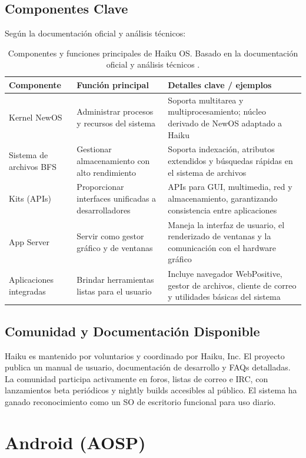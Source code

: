 \subsection{Componentes Clave}
Según la documentación oficial y análisis técnicos:
\begin{table}[H]
\centering
\begin{tabular}{p{3.2cm}p{5cm}p{6cm}}
\hline
\textbf{Componente} & \textbf{Función principal} & \textbf{Detalles clave / ejemplos} \\
\hline
Kernel NewOS & Administrar procesos y recursos del sistema & Soporta multitarea y multiprocesamiento; núcleo derivado de NewOS adaptado a Haiku \\
\hline
Sistema de archivos BFS & Gestionar almacenamiento con alto rendimiento & Soporta indexación, atributos extendidos y búsquedas rápidas en el sistema de archivos \\
\hline
Kits (APIs) & Proporcionar interfaces unificadas a desarrolladores & APIs para GUI, multimedia, red y almacenamiento, garantizando consistencia entre aplicaciones \\
\hline
App Server & Servir como gestor gráfico y de ventanas & Maneja la interfaz de usuario, el renderizado de ventanas y la comunicación con el hardware gráfico \\
\hline
Aplicaciones integradas & Brindar herramientas listas para el usuario & Incluye navegador WebPositive, gestor de archivos, cliente de correo y utilidades básicas del sistema \\
\hline
\end{tabular}
\caption[Componentes y funciones clave de Haiku OS]{Componentes y funciones principales de Haiku OS. Basado en la documentación oficial y análisis técnicos \parencite{haiku-docs}.}
\label{tab:componentes-haiku}
\end{table}


\subsection{Comunidad y Documentación Disponible}
Haiku es mantenido por voluntarios y coordinado por Haiku, Inc. 
El proyecto publica un manual de usuario, documentación de desarrollo y FAQs detalladas.  
La comunidad participa activamente en foros, listas de correo e IRC, 
con lanzamientos beta periódicos y nightly builds accesibles al público. 
El sistema ha ganado reconocimiento como un SO de escritorio funcional para uso diario.

\section{Android (AOSP)}

